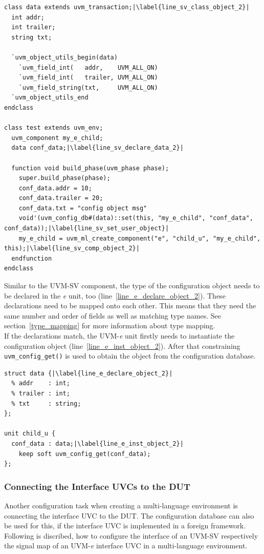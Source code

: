 \lstset{language=SystemVerilog, numbers = left, escapechar=|, breaklines=true}
\begin{lstlisting}[frame=htrbl, caption={SystemVerilog: register an object in configuration database},
label={lst:SV_set_object}]
class data extends uvm_transaction;|\label{line_sv_class_object_2}|
  int addr;
  int trailer;
  string txt;
  
  `uvm_object_utils_begin(data)
    `uvm_field_int(   addr,    UVM_ALL_ON)
    `uvm_field_int(   trailer, UVM_ALL_ON)
    `uvm_field_string(txt,     UVM_ALL_ON)
  `uvm_object_utils_end
endclass

class test extends uvm_env;
  uvm_component my_e_child; 
  data conf_data;|\label{line_sv_declare_data_2}|
  
  function void build_phase(uvm_phase phase);
    super.build_phase(phase);
    conf_data.addr = 10;
    conf_data.trailer = 20;
    conf_data.txt = "config object msg"
    void'(uvm_config_db#(data)::set(this, "my_e_child", "conf_data", conf_data));|\label{line_sv_set_user_object}|
    my_e_child = uvm_ml_create_component("e", "child_u", "my_e_child", this);|\label{line_sv_comp_object_2}|
  endfunction
endclass
\end{lstlisting}

Similar to the UVM-SV component, the type of the configuration object needs to be declared in the
\textit{e} unit, too (line~\ref{line_e_declare_object_2}). These declarations need to be mapped onto each other. This
means that they need the same number and order of fields as well as matching type names. See section~\ref{type_mapping}
for more information about type mapping.\\
If the declarations match, the UVM-\textit{e} unit firstly needs to instantiate the configuration object
(line~\ref{line_e_inst_object_2}). After that constraining \lstinline$uvm_config_get()$ is used to obtain the object from the
configuration database.

\lstset{language=e, numbers = left, escapechar=|, breaklines=true}
\begin{lstlisting}[frame=htrbl, caption={e: getting an object from configuration database}, label={lst:e_get_object}]
struct data {|\label{line_e_declare_object_2}|
  % addr    : int;
  % trailer : int;
  % txt     : string;
};

unit child_u {
  conf_data : data;|\label{line_e_inst_object_2}|
    keep soft uvm_config_get(conf_data);
};
\end{lstlisting}
\subsubsection{Connecting the Interface UVCs to the DUT}
Another configuration task when creating a multi-language environment is connecting the interface UVC to the DUT. The configuration database can also be used for this, if the interface UVC is implemented in a foreign framework. Following is discribed, how to configure the interface of an UVM-SV respectively the signal map of an UVM-\textit{e} interface UVC in a multi-language environment.
